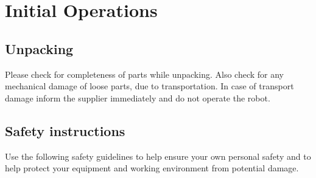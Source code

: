 \newpage

\chapter{Initial Operations}
\section{Unpacking}
Please check for completeness of parts while unpacking. Also check for any mechanical damage of loose parts, due to transportation. In case of transport damage inform the supplier immediately and do not operate the robot.

\section{Safety instructions}
Use the following safety guidelines to help ensure your own personal safety and to help protect your equipment and working environment from potential damage.
